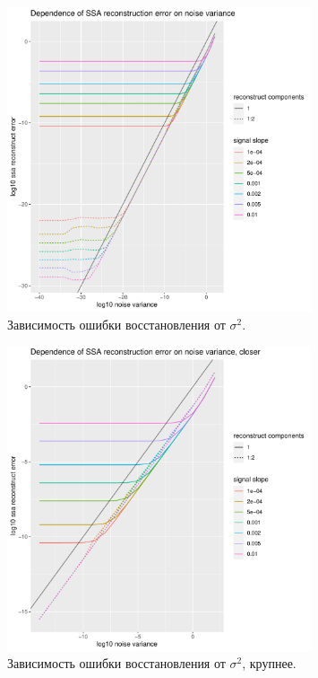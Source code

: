 \documentclass[specialist, substylefile = spbureport.rtx,
    subf,href,colorlinks=true, 12pt]{disser}
\begin{document}
        \begin{figure}[h]
            \centering
            \includegraphics[width=0.8\textwidth]{experiment_3_lost1.pdf}
            \caption{Зависимость ошибки восстановления от $\sigma^2$.}
            \label{fig:exp3_lost1}
        \end{figure}

        \begin{figure}[h]
            \centering
            \includegraphics[width=0.8\textwidth]{experiment_3_lost2.pdf}
            \caption{Зависимость ошибки восстановления от $\sigma^2$, крупнее.}
            \label{fig:exp3_lost2}
        \end{figure}
\end{document}
